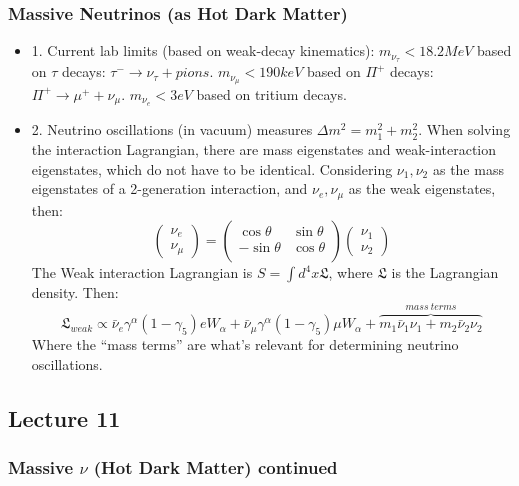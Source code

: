 \documentclass{article}
\begin{document}
\subsubsection*{ Massive Neutrinos (as Hot Dark Matter) }
\begin{itemize}
\item{1.} Current lab limits (based on weak-decay kinematics):
$m_{\nu_\tau}<18.2 MeV$ based on $\tau$ decays: $\tau^-\to\nu_\tau+pions$.
$m_{\nu_\mu}<190 keV$ based on $\Pi^+$ decays: $\Pi^+\to\mu^++\nu_\mu$.
$m_{\nu_e}<3 eV$ based on tritium decays.
\item{2.} Neutrino oscillations (in vacuum) measures $\Delta m^2=m_1^2+m_2^2$.
When solving the interaction Lagrangian, there are mass eigenstates and
weak-interaction eigenstates, which do not have to be identical.  Considering
$\nu_1,\nu_2$ as the mass eigenstates of a 2-generation interaction, and
$\nu_e,\nu_\mu$ as the weak eigenstates, then:
$$\begin{pmatrix} \nu_e\\ \nu_\mu\end{pmatrix}=\begin{pmatrix} \cos\theta&\sin\theta\\
-\sin\theta&\cos\theta\\\end{pmatrix}\begin{pmatrix} \nu_1\\ \nu_2\end{pmatrix}$$
The Weak interaction Lagrangian is $S=\int{d^4x\mathfrak{L}}$, where $\mathfrak{L}$ is 
the Lagrangian density.  Then:
$$\mathfrak{L}_{weak}\propto\bar \nu_e\gamma^\alpha(1-\gamma_5)eW_\alpha
+\bar \nu_\mu\gamma^\alpha(1-\gamma_5)\mu W_\alpha
+\overbrace{m_1\bar \nu_1\nu_1+m_2\bar \nu_2\nu_2}^{mass\ terms}$$
Where the ``mass terms'' are what's relevant for determining neutrino
oscillations.
\end{itemize}

\subsection{Lecture 11}
\subsubsection*{ Massive $\nu$ (Hot Dark Matter) continued}
\end{document}
